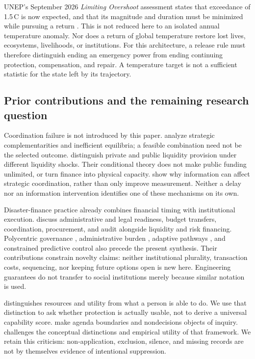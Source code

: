 \documentclass[11pt,a4paper]{article}
\numberwithin{equation}{section}
\theoremstyle{definition}
\theoremstyle{plain}
\theoremstyle{remark}
\begin{document}
UNEP's September 2026 \emph{Limiting Overshoot} assessment states that exceedance of 1.5\,\textdegree C is now expected, and that its magnitude and duration must be minimized while pursuing a return \citep{unep2026overshoot}. This is not reduced here to an isolated annual temperature anomaly. Nor does a return of global temperature restore lost lives, ecosystems, livelihoods, or institutions. For this architecture, a release rule must therefore distinguish ending an emergency power from ending continuing protection, compensation, and repair. A temperature target is not a sufficient statistic for the state left by its trajectory.

\subsection{Prior contributions and the remaining research question}
\label{sec:priorwork}

Coordination failure is not introduced by this paper. \citet{cooperjohn1988} analyze strategic complementarities and inefficient equilibria; a feasible combination need not be the selected outcome. \citet{holmstromtirole1998} distinguish private and public liquidity provision under different liquidity shocks. Their conditional theory does not make public funding unlimited, or turn finance into physical capacity. \citet{morrisshin2002} show why information can affect strategic coordination, rather than only improve measurement. Neither a delay nor an information intervention identifies one of these mechanisms on its own.

Disaster-finance practice already combines financial timing with institutional execution. \citet{ghesquieremahul2010} discuss administrative and legal readiness, budget transfers, coordination, procurement, and audit alongside liquidity and risk financing. Polycentric governance \citep{ostrom2010}, administrative burden \citep{moynihan2015}, adaptive pathways \citep{haasnoot2013}, and constrained predictive control \citep{mayne2000} also precede the present synthesis. Their contributions constrain novelty claims: neither institutional plurality, transaction costs, sequencing, nor keeping future options open is new here. Engineering guarantees do not transfer to social institutions merely because similar notation is used.

\citet{sen1980} distinguishes resources and utility from what a person is able to do. We use that distinction to ask whether protection is actually usable, not to derive a universal capability score. \citet{bachrachbaratz1962,bachrachbaratz1963} make agenda boundaries and nondecisions objects of inquiry. \citet{debnam1975} challenges the conceptual distinctions and empirical utility of that framework. We retain this criticism: non-application, exclusion, silence, and missing records are not by themselves evidence of intentional suppression.
\end{document}
